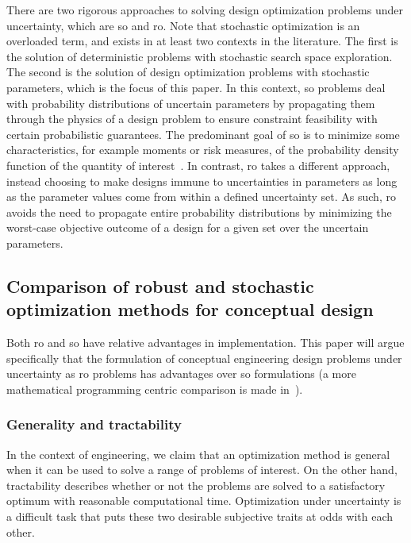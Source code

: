 There are two rigorous approaches to solving design optimization problems under uncertainty,
which are \gls{so} and \gls{ro}. Note that stochastic
optimization is an overloaded term, and exists in at least two contexts in the literature. The first is the solution
of deterministic problems with stochastic search space exploration. The second is the solution
of design optimization problems with stochastic parameters, which is the focus of this paper.
In this context, \gls{so} problems deal with probability distributions of
uncertain parameters by propagating them through the
physics of a design problem to ensure constraint feasibility with certain probabilistic guarantees.
The predominant goal of \gls{so} is to minimize some characteristics, for example moments or risk measures,
of the probability density function of the quantity of interest~\cite{Diwekar2008}.
In contrast, \gls{ro} takes a different approach, instead choosing to make designs immune to
uncertainties in parameters as long as the parameter values come from within a defined
uncertainty set. As such, \gls{ro} avoids the need to propagate entire probability
distributions by minimizing the worst-case objective outcome of a design for a
given set over the uncertain parameters.

\subsection{Comparison of robust and stochastic optimization methods for conceptual design}
\label{sec:robustvsstochastic}

Both \gls{ro} and \gls{so} have relative advantages in implementation. This paper will
argue specifically that the formulation of conceptual engineering design problems under uncertainty as
\gls{ro} problems has advantages over \gls{so} formulations (a more
mathematical programming centric comparison is made in~\cite{Bertsimas2011}).

\subsubsection{Generality and tractability}

In the context of engineering, we claim that an optimization method is general
when it can be used to solve a range of problems of interest. On the other hand,
tractability describes whether or not the problems are solved to a satisfactory
optimum with reasonable computational time. Optimization
under uncertainty is a difficult task that puts these two desirable subjective traits
at odds with each other.


